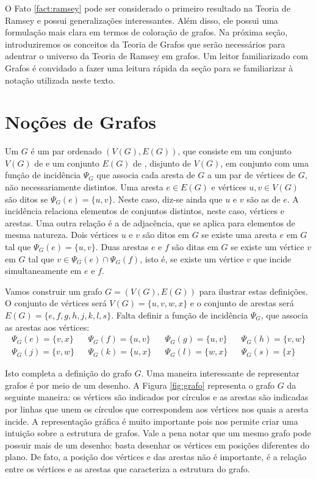 O Fato \ref{fact:ramsey} pode ser considerado o primeiro resultado na Teoria de Ramsey e possui generalizações interessantes. Além disso, ele possui uma formulação mais clara em termos de coloração de grafos. Na próxima seção, introduziremos os conceitos da Teoria de Grafos que serão necessários para adentrar o universo da Teoria de Ramsey em grafos. Um leitor familiarizado com Grafos é convidado a fazer uma leitura rápida da seção para se familiarizar à notação utilizada neste texto.


\section{Noções de Grafos}

Um  $G$ é um par ordenado $(V(G), E(G))$, que consiste em um conjunto $V(G)$ de  e um conjunto $E(G)$ de , disjunto de $V(G)$, em conjunto com uma função de incidência $\Psi_G$ que associa cada aresta de $G$ a um par de vértices de $G$, não necessariamente distintos.
Uma aresta $e \in E(G)$ e vértices $u, v \in V(G)$ são ditos  se $\Psi_G(e) = \{u,v\}$. Neste caso, diz-se ainda que $u$ e $v$ são as  de $e$. A incidência relaciona elementos de conjuntos distintos, neste caso, vértices e arestas.
Uma outra relação é a de adjacência, que se aplica para elementos de mesma natureza. Dois vértices $u$ e $v$ são ditos  em $G$ se existe uma aresta $e$ em $G$ tal que $\Psi_G(e) = \{u,v\}$. Duas arestas $e$ e $f$ são ditas  em $G$ se existe um vértice $v$ em $G$ tal que $v \in \Psi_G(e) \cap \Psi_G(f)$, isto é, se existe um vértice $v$ que incide simultaneamente em $e$ e $f$.

Vamos construir um grafo $G = (V(G), E(G))$ para ilustrar estas definições. O conjunto de vértices será $V(G) = \{u,v,w,x\}$ e o conjunto de arestas será $E(G) = \{e, f, g, h, j, k, l, s\}$. Falta definir a função de incidência $\Psi_G$, que associa as arestas aos vértices:
\begin{align*}
\Psi_G(e) = \{v,x\} & &
\Psi_G(f) = \{u,v\} & &
\Psi_G(g) = \{u,v\} & &
\Psi_G(h) = \{v,w\} \\
\Psi_G(j) = \{v,w\} & &
\Psi_G(k) = \{u,x\} & &
\Psi_G(l) = \{w,x\} & &
\Psi_G(s) = \{x\}
\end{align*}

Isto completa a definição do grafo $G$. Uma maneira interessante de representar grafos é por meio de um desenho. A Figura \ref{fig:grafo} representa o grafo $G$ da seguinte maneira: os vértices são indicados por círculos e as arestas são indicadas por linhas que unem os círculos que correspondem aos vértices nos quais a aresta incide. A representação gráfica é muito importante pois nos permite criar uma intuição sobre a estrutura de grafos. Vale a pena notar que um mesmo grafo pode possuir mais de um desenho: basta desenhar os vértices em posições diferentes do plano. De fato, a posição dos vértices e das arestas não é importante, é a relação entre os vértices e as arestas que caracteriza a estrutura do grafo.

